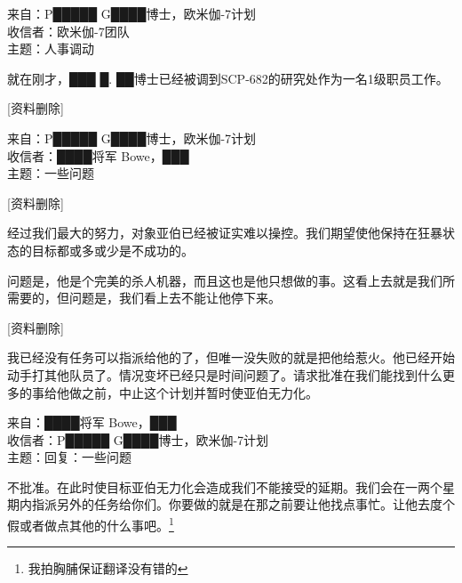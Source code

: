 \begin{scpbox}

来自：P█████ G████博士，欧米伽-7计划\\
收信者：欧米伽-7团队\\
主题：人事调动

就在刚才，███ █. ██博士已经被调到SCP-682的研究处作为一名1级职员工作。

\end{scpbox}

\hr

\begin{scpbox}

{[}资料删除]

\end{scpbox}

\hr

\begin{scpbox}

来自：P█████ G████博士，欧米伽-7计划\\
收信者：████将军 Bowe，███\\
主题：一些问题

{[}资料删除]

经过我们最大的努力，对象亚伯已经被证实难以操控。我们期望使他保持在狂暴状态的目标都或多或少是不成功的。

问题是，他是个完美的杀人机器，而且这也是他只想做的事。这看上去就是我们所需要的，但问题是，我们看上去不能让他停下来。

{[}资料删除]

我已经没有任务可以指派给他的了，但唯一没失败的就是把他给惹火。他已经开始动手打其他队员了。情况变坏已经只是时间问题了。请求批准在我们能找到什么更多的事给他做之前，中止这个计划并暂时使亚伯无力化。

\end{scpbox}

\hr

\begin{scpbox}

来自：████将军 Bowe，███\\
收信者：P█████ G████博士，欧米伽-7计划\\
主题：回复：一些问题

不批准。在此时使目标亚伯无力化会造成我们不能接受的延期。我们会在一两个星期内指派另外的任务给你们。你要做的就是在那之前要让他找点事忙。让他去度个假或者做点其他的什么事吧。\footnote{我拍胸脯保证翻译没有错的}

\end{scpbox}

\hr


